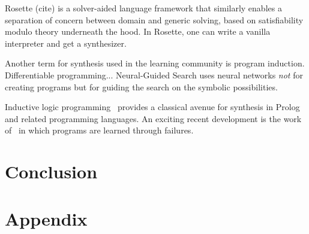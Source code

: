 \documentclass[acmsmall]{acmart}
\theoremstyle{mytheoremstyle}
\begin{document}
Rosette (cite) is a solver-aided language framework that similarly enables a separation of concern between domain and generic solving, based on satisfiability modulo theory underneath the hood. In Rosette, one can write a vanilla interpreter and get a synthesizer.

Another term for synthesis used in the learning community is program induction.
Differentiable programming...
Neural-Guided Search uses neural networks \emph{not} for creating programs but for guiding the search on the symbolic possibilities.

Inductive logic programming~\cite{ilp} provides a classical avenue for synthesis in Prolog and related programming languages. An exciting recent development is the work of~\citet{cropper} in which programs are learned through failures.


\section{Conclusion}






\newpage
\section{Appendix}
\end{document}
